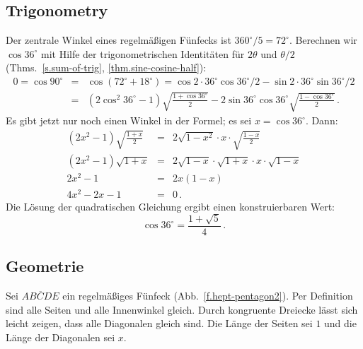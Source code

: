 \subsection{Trigonometry}
Der zentrale Winkel eines regelmäßigen Fünfecks ist $360^\circ/5=72^\circ$. Berechnen wir $\cos 36^\circ$ mit Hilfe der trigonometrischen Identitäten für $2\theta$ und $\theta/2$ (Thms.~\ref{s.sum-of-trig}, \ref{thm.sine-cosine-half}):
\begin{eqnarray*}
0=\cos 90^\circ &=& \cos(72^\circ+18^\circ)=\cos 2\cdot 36^\circ\cos 36^\circ/2 - \sin 2\cdot 36^\circ\sin 36^\circ/2\\
&=&(2\cos^2 36^\circ-1)\sqrt{\frac{1+\cos 36^\circ}{2}}-2\sin 36^\circ\cos 36^\circ\sqrt{\frac{1-\cos 36^\circ}{2}}\,.
\end{eqnarray*}
Es gibt jetzt nur noch einen Winkel in der Formel; es sei $x=\cos 36^\circ$. Dann:
\begin{eqnarray*}
(2x^2-1)\sqrt{\frac{1+x}{2}}&=&2\sqrt{1-x^2}\cdot x \cdot \sqrt{\frac{1-x}{2}}\\
(2x^2-1)\sqrt{1+x}&=&2\sqrt{1-x}\cdot\sqrt{1+x}\cdot x \cdot \sqrt{1-x}\\
2x^2-1&=&2x(1-x)\\
4x^2-2x-1&=&0\,.
\end{eqnarray*}
Die Lösung der quadratischen Gleichung ergibt einen konstruierbaren Wert:
\[
\cos 36^\circ = \frac{1+\sqrt{5}}{4}\,.
\]

\subsection{Geometrie}\label{s.geometry-pentagon}

Sei $\overline{ABCDE}$ ein regelmäßiges Fünfeck (Abb.~\ref{f.hept-pentagon2}). Per Definition sind alle Seiten und alle Innenwinkel gleich. Durch kongruente Dreiecke lässt sich leicht zeigen, dass alle Diagonalen gleich sind. Die Länge der Seiten sei $1$ und die Länge der Diagonalen sei $x$.

